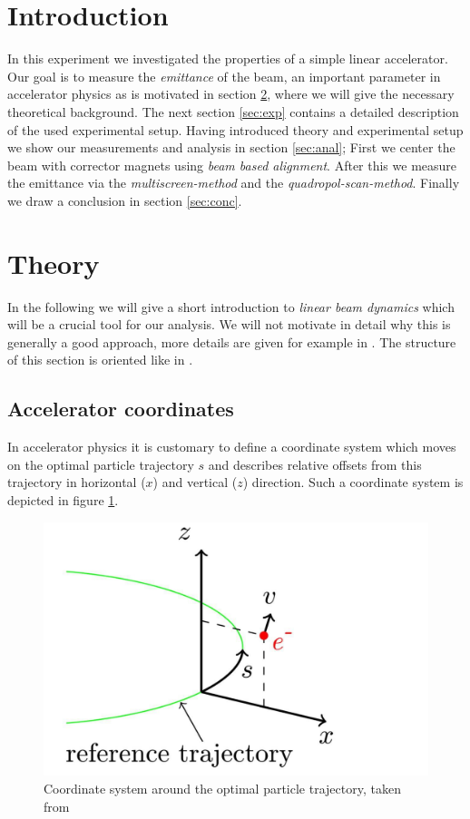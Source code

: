 \documentclass[11pt,a4paper,notitlepage]{scrartcl}
\begin{document}
\setcounter{page}{-1}
\newpage

\tableofcontents
\thispagestyle{empty}
\newpage
\section{Introduction}
In this experiment we investigated the properties of a simple linear accelerator. Our goal is to measure the \emph{emittance} of the beam, an important parameter in accelerator physics as is motivated in section \ref{sec:theo}, where we will give the necessary theoretical background. The next section \ref{sec:exp} contains a detailed description of the used experimental setup. Having introduced theory and experimental setup we show our measurements and analysis in section \ref{sec:anal}; First we center the beam with corrector magnets using \emph{beam based alignment}. After this we measure the emittance via the \emph{multiscreen-method} and the \emph{quadropol-scan-method}. Finally we draw a conclusion in section \ref{sec:conc}. 


\section{Theory}
\label{sec:theo}
In the following we will give a short introduction to \emph{linear beam dynamics} which will be a crucial tool for our analysis. We will not motivate in detail why this is generally a good approach, more details are given for example in \cite{wille}. The structure of this section is oriented like in \cite{script}.
\subsection{Accelerator coordinates}
In accelerator physics it is customary to define a coordinate system which moves on the optimal particle trajectory $s$ and describes relative offsets from this trajectory in horizontal ($x$) and vertical ($z$) direction. Such a coordinate system is depicted in figure \ref{fig:coord}.

\begin{figure}[htbp]
	\centering
	\includegraphics[width=.3\linewidth]{coord}
	\caption{Coordinate system around the optimal particle trajectory, taken from \cite{script}}
	\label{fig:coord}
\end{figure}
\end{document}
